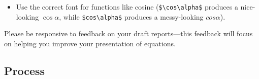 \documentclass[12pt]{article}
\begin{document}
\begin{itemize}
\begin{quote}
\begin{lstlisting}[language={[LaTeX]TeX}]
c_{D} &= 2\sin^{2}\alpha
\end{align*}
\end{lstlisting}
\end{quote}
produces the nice-looking result
\begin{align*}
c_{L} &= 2\sin\alpha \cos\alpha \\ 
c_{D} &= 2\sin^{2}\alpha
\end{align*}
while
\begin{quote}
\begin{lstlisting}[language={[LaTeX]TeX}]
\begin{equation*}
c_{L} = 2\sin\alpha \cos\alpha
\end{equation*}
\begin{equation*}
c_{D} = 2\sin^{2}\alpha
\end{equation*}
\end{lstlisting}
\end{quote}
produces the messy-looking result
\begin{equation*}
c_{L} = 2\sin\alpha \cos\alpha
\end{equation*}
\begin{equation*}
c_{D} = 2\sin^{2}\alpha.
\end{equation*}
\item Use the correct font for functions like cosine (\lstinline|$\cos\alpha$| produces a nice-looking $\cos\alpha$, while \lstinline|$cos\alpha$| produces a messy-looking $cos\alpha$).
\end{itemize}
Please be responsive to feedback on your draft reports---this feedback will focus on helping you improve your presentation of equations.


\subsection{Process}
\end{document}
